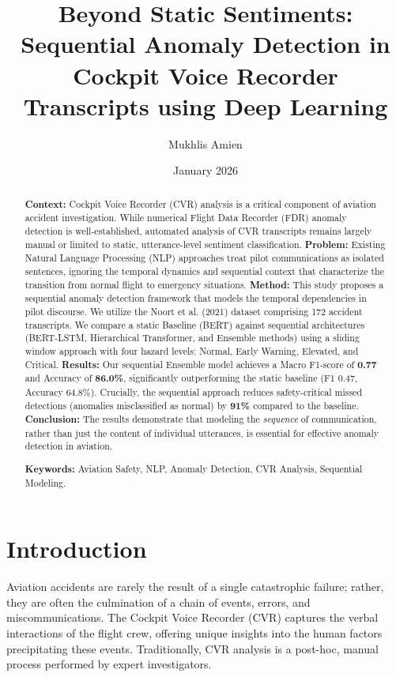 \documentclass[11pt, a4paper]{article}
\title{\textbf{Beyond Static Sentiments: Sequential Anomaly Detection in Cockpit Voice Recorder Transcripts using Deep Learning}}
\author{Mukhlis Amien}
\affil{STIKI Malang, Indonesia}
\date{January 2026}
\begin{document}
\maketitle

\begin{abstract}
\noindent \textbf{Context:} Cockpit Voice Recorder (CVR) analysis is a critical component of aviation accident investigation. While numerical Flight Data Recorder (FDR) anomaly detection is well-established, automated analysis of CVR transcripts remains largely manual or limited to static, utterance-level sentiment classification.
\textbf{Problem:} Existing Natural Language Processing (NLP) approaches treat pilot communications as isolated sentences, ignoring the temporal dynamics and sequential context that characterize the transition from normal flight to emergency situations.
\textbf{Method:} This study proposes a sequential anomaly detection framework that models the temporal dependencies in pilot discourse. We utilize the Noort et al. (2021) dataset comprising 172 accident transcripts. We compare a static Baseline (BERT) against sequential architectures (BERT-LSTM, Hierarchical Transformer, and Ensemble methods) using a sliding window approach with four hazard levels: Normal, Early Warning, Elevated, and Critical.
\textbf{Results:} Our sequential Ensemble model achieves a Macro F1-score of \textbf{0.77} and Accuracy of \textbf{86.0\%}, significantly outperforming the static baseline (F1 0.47, Accuracy 64.8\%). Crucially, the sequential approach reduces safety-critical missed detections (anomalies misclassified as normal) by \textbf{91\%} compared to the baseline.
\textbf{Conclusion:} The results demonstrate that modeling the \textit{sequence} of communication, rather than just the content of individual utterances, is essential for effective anomaly detection in aviation.

\vspace{0.5cm}
\noindent \textbf{Keywords:} Aviation Safety, NLP, Anomaly Detection, CVR Analysis, Sequential Modeling.
\end{abstract}

\section{Introduction}
Aviation accidents are rarely the result of a single catastrophic failure; rather, they are often the culmination of a chain of events, errors, and miscommunications. The Cockpit Voice Recorder (CVR) captures the verbal interactions of the flight crew, offering unique insights into the human factors precipitating these events. Traditionally, CVR analysis is a post-hoc, manual process performed by expert investigators.
\end{document}
